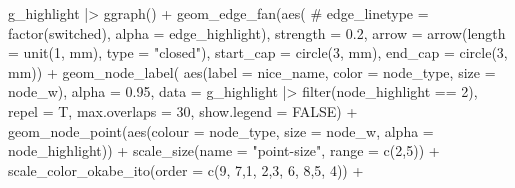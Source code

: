 \documentclass[
  letterpaper,
  DIV=11,
  numbers=noendperiod]{scrartcl}
\newenvironment{Shaded}{\begin{snugshade}}{\end{snugshade}}
\newcommand{\AttributeTok}[1]{\textcolor[rgb]{0.40,0.45,0.13}{#1}}
\newcommand{\CommentTok}[1]{\textcolor[rgb]{0.37,0.37,0.37}{#1}}
\newcommand{\ConstantTok}[1]{\textcolor[rgb]{0.56,0.35,0.01}{#1}}
\newcommand{\DecValTok}[1]{\textcolor[rgb]{0.68,0.00,0.00}{#1}}
\newcommand{\FloatTok}[1]{\textcolor[rgb]{0.68,0.00,0.00}{#1}}
\newcommand{\FunctionTok}[1]{\textcolor[rgb]{0.28,0.35,0.67}{#1}}
\newcommand{\NormalTok}[1]{\textcolor[rgb]{0.00,0.23,0.31}{#1}}
\newcommand{\SpecialCharTok}[1]{\textcolor[rgb]{0.37,0.37,0.37}{#1}}
\newcommand{\StringTok}[1]{\textcolor[rgb]{0.13,0.47,0.30}{#1}}
\begin{document}
\begin{Shaded}
\begin{Highlighting}[]
\NormalTok{    g\_highlight }\SpecialCharTok{|\textgreater{}}
        \FunctionTok{ggraph}\NormalTok{() }\SpecialCharTok{+}
        \FunctionTok{geom\_edge\_fan}\NormalTok{(}\FunctionTok{aes}\NormalTok{(}
            \CommentTok{\# edge\_linetype = factor(switched),}
            \AttributeTok{alpha =}\NormalTok{ edge\_highlight), }
            \AttributeTok{strength =} \FloatTok{0.2}\NormalTok{,}
            \AttributeTok{arrow =} \FunctionTok{arrow}\NormalTok{(}\AttributeTok{length =} \FunctionTok{unit}\NormalTok{(}\DecValTok{1}\NormalTok{, }\StringTok{\textquotesingle{}mm\textquotesingle{}}\NormalTok{),}
                          \AttributeTok{type =} \StringTok{"closed"}\NormalTok{),}
            \AttributeTok{start\_cap =} \FunctionTok{circle}\NormalTok{(}\DecValTok{3}\NormalTok{, }\StringTok{\textquotesingle{}mm\textquotesingle{}}\NormalTok{),}
            \AttributeTok{end\_cap =} \FunctionTok{circle}\NormalTok{(}\DecValTok{3}\NormalTok{, }\StringTok{\textquotesingle{}mm\textquotesingle{}}\NormalTok{)) }\SpecialCharTok{+}
        \FunctionTok{geom\_node\_label}\NormalTok{(}
            \FunctionTok{aes}\NormalTok{(}\AttributeTok{label =}\NormalTok{ nice\_name, }
                \AttributeTok{color =}\NormalTok{ node\_type,}
                \AttributeTok{size =}\NormalTok{ node\_w),}
            \AttributeTok{alpha =} \FloatTok{0.95}\NormalTok{,}
            \AttributeTok{data =}\NormalTok{ g\_highlight }\SpecialCharTok{|\textgreater{}} 
                \FunctionTok{filter}\NormalTok{(node\_highlight }\SpecialCharTok{==} \DecValTok{2}\NormalTok{),}
            \AttributeTok{repel =}\NormalTok{ T, }\AttributeTok{max.overlaps =} \DecValTok{30}\NormalTok{,}
            \AttributeTok{show.legend =} \ConstantTok{FALSE}\NormalTok{) }\SpecialCharTok{+}
        \FunctionTok{geom\_node\_point}\NormalTok{(}\FunctionTok{aes}\NormalTok{(}\AttributeTok{colour =}\NormalTok{ node\_type,}
                            \AttributeTok{size =}\NormalTok{ node\_w,}
                            \AttributeTok{alpha =}\NormalTok{ node\_highlight)) }\SpecialCharTok{+}
        \FunctionTok{scale\_size}\NormalTok{(}\AttributeTok{name =} \StringTok{"point{-}size"}\NormalTok{, }\AttributeTok{range =} \FunctionTok{c}\NormalTok{(}\DecValTok{2}\NormalTok{,}\DecValTok{5}\NormalTok{)) }\SpecialCharTok{+}
        \FunctionTok{scale\_color\_okabe\_ito}\NormalTok{(}\AttributeTok{order =} \FunctionTok{c}\NormalTok{(}\DecValTok{9}\NormalTok{, }\DecValTok{7}\NormalTok{,}\DecValTok{1}\NormalTok{, }\DecValTok{2}\NormalTok{,}\DecValTok{3}\NormalTok{, }\DecValTok{6}\NormalTok{, }\DecValTok{8}\NormalTok{,}\DecValTok{5}\NormalTok{, }\DecValTok{4}\NormalTok{)) }\SpecialCharTok{+}

\end{Highlighting}
\end{Shaded}
\end{document}
